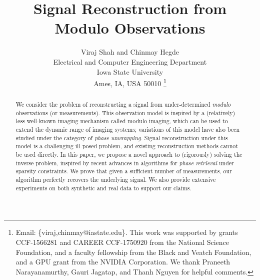 \documentclass[10pt]{article}
\begin{document}
\title{Signal Reconstruction from Modulo Observations}

\author{
	Viraj Shah and Chinmay Hegde \\
	Electrical and Computer Engineering Department \\
	Iowa State University \\
	Ames, IA, USA 50010
	\thanks{Email: \{viraj,chinmay@iastate.edu\}. This work was supported by grants CCF-1566281 and CAREER CCF-1750920 from the National Science Foundation, and a faculty fellowship from the Black and Veatch Foundation, and a GPU grant from the NVIDIA Corporation.	
	We thank Praneeth Narayanamurthy, Gauri Jagatap, and Thanh Nguyen for helpful comments.
}
}


\maketitle

\begin{abstract}
	We consider the problem of reconstructing a signal from under-determined \emph{modulo} observations (or measurements). This observation model is inspired by a (relatively) less well-known imaging mechanism called modulo imaging, which can be used to extend the dynamic range of imaging systems; variations of this model have also been studied under the category of \emph{phase unwrapping}. Signal reconstruction under this model is a challenging ill-posed problem, and existing reconstruction methods cannot be used directly. In this paper, we propose a novel approach to (rigorously) solving the inverse problem, inspired by recent advances in algorithms for \emph{phase retrieval} under sparsity constraints. We prove that given a sufficient number of measurements, our algorithm perfectly recovers the underlying signal. We also provide extensive experiments on both synthetic and real data to support our claims. 
\end{abstract}







%
%
%


%
%
\end{document}
